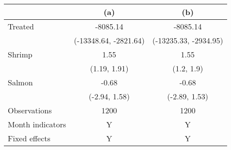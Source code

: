 \begin{tabular}{lcc}
\toprule
{} &                    (a) &                    (b) \\
\midrule
Treated          &               -8085.14 &               -8085.14 \\
                 &  (-13348.64, -2821.64) &  (-13235.33, -2934.95) \\
Shrimp           &                   1.55 &                   1.55 \\
                 &           (1.19, 1.91) &             (1.2, 1.9) \\
Salmon           &                  -0.68 &                  -0.68 \\
                 &          (-2.94, 1.58) &          (-2.89, 1.53) \\
Observations     &                   1200 &                   1200 \\
Month indicators &                      Y &                      Y \\
Fixed effects    &                      Y &                      Y \\
\bottomrule
\end{tabular}
